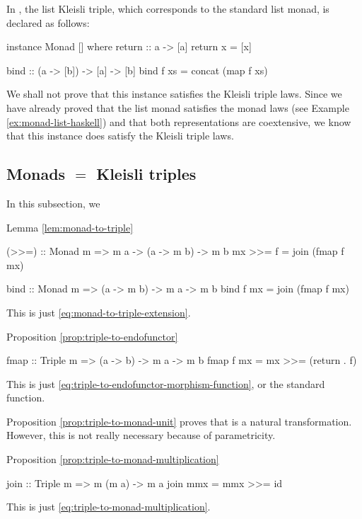 \begin{example}
  \label{ex:triple-list-haskell}

  In \hask, the list Kleisli triple, which corresponds to the standard
  list monad, is declared as follows:
  \begin{codehaskell}
instance Monad [] where
  return :: a -> [a]
  return x = [x]

  bind :: (a -> [b]) -> [a] -> [b]
  bind f xs = concat (map f xs)
  \end{codehaskell}
  We shall not prove that this instance satisfies the Kleisli triple
  laws. Since we have already proved that the list monad satisfies the
  monad laws (see Example \ref{ex:monad-list-haskell}) and that both
  representations are coextensive, we know that this instance does
  satisfy the Kleisli triple laws.

\end{example}

\subsection*{Monads $=$ Kleisli triples}

In this subsection, we

Lemma \ref{lem:monad-to-triple}

\begin{codehaskell}
(>>=) :: Monad m => m a -> (a -> m b) -> m b
mx >>= f = join (fmap f mx)
\end{codehaskell}

\begin{codehaskell}
bind :: Monad m => (a -> m b) -> m a -> m b
bind f mx = join (fmap f mx)
\end{codehaskell}
This is just \eqref{eq:monad-to-triple-extension}.

Proposition \ref{prop:triple-to-endofunctor}
\begin{codehaskell}
fmap :: Triple m => (a -> b) -> m a -> m b
fmap f mx = mx >>= (return . f)
\end{codehaskell}
This is just \eqref{eq:triple-to-endofunctor-morphism-function}, or
the standard  function.

Proposition \ref{prop:triple-to-monad-unit} proves that
 is a natural transformation. However, this is not
really necessary because of parametricity.

Proposition \ref{prop:triple-to-monad-multiplication}
\begin{codehaskell}
join :: Triple m => m (m a) -> m a
join mmx = mmx >>= id
\end{codehaskell}
This is just \eqref{eq:triple-to-monad-multiplication}.

